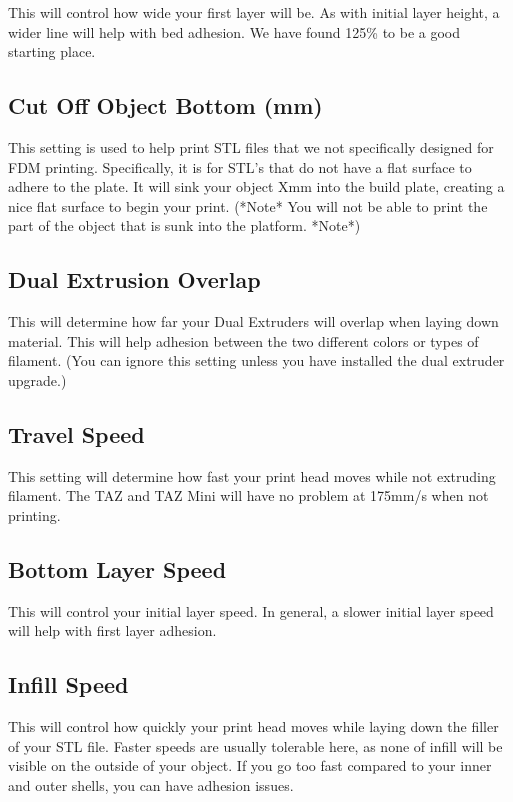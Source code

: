 This will control how wide your first layer will be. As with initial layer height, a wider line will help with bed adhesion. We have found 125\% to be a good starting place.

\subsection{Cut Off Object Bottom (mm)}

This setting is used to help print STL files that we not specifically designed for FDM printing. Specifically, it is for STL's that do not have a flat surface to adhere to the plate. It will sink your object Xmm into the build plate, creating a nice flat surface to begin your print. (*Note* You will not be able to print the part of the object that is sunk into the platform. *Note*)

\subsection{Dual Extrusion Overlap}

This will determine how far your Dual Extruders will overlap when 	laying down material. This will help adhesion between the two different colors or types of filament. (You can ignore this setting unless you have installed the dual extruder upgrade.)

\subsection{Travel Speed}

This setting will determine how fast your print head moves while not extruding filament. The TAZ and TAZ Mini will have no problem at 175mm/s when not printing.

\subsection{Bottom Layer Speed}

This will control your initial layer speed. In general, a slower 	initial layer speed will help with first layer adhesion. 

\subsection{Infill Speed}

This will control how quickly your print head moves while laying down the filler of your STL file. Faster speeds are usually tolerable here, as none of infill will be visible on the outside of your object. If you go too fast compared to your inner and outer shells, you can have adhesion issues.

